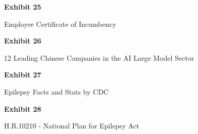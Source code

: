 \documentclass{article}
\begin{document}
% 



\vspace*{\fill}
\begin{center}
{\LARGE \bf
Exhibit 25
}

\vspace{10\baselineskip}

{\large Employee Certificate of Incumbency}

\end{center}
\vspace*{\fill}

%




\vspace*{\fill}
\begin{center}
{\LARGE \bf
Exhibit 26
}

\vspace{10\baselineskip}

{\large 12 Leading Chinese Companies in the AI Large Model Sector}

\end{center}
\vspace*{\fill}






\vspace*{\fill}
\begin{center}
{\LARGE \bf
Exhibit 27
}

\vspace{10\baselineskip}

{\large Epilepsy Facts and Stats by CDC }

\end{center}
\vspace*{\fill}






\vspace*{\fill}
\begin{center}

{\LARGE \bf
Exhibit 28
}

\vspace{10\baselineskip}

{\large H.R.10210 - National Plan for Epilepsy Act}

\end{center}
\vspace*{\fill}
\end{document}
